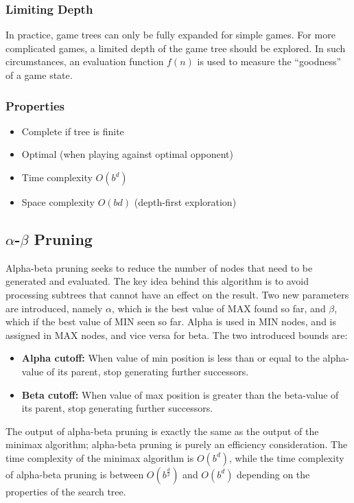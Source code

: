 \documentclass[12pt,titlepage]{article}
\begin{document}
      \subsubsection{Limiting Depth}
        In practice, game trees can only be fully expanded for simple games. For more complicated games, a limited depth of the game tree should be explored.
        In such circumstances, an evaluation function $f(n)$ is used to measure the ``goodness'' of a game state.

      \subsubsection{Properties}
        \begin{itemize}
          \item Complete if tree is finite
          \item Optimal (when playing against optimal opponent)
          \item Time complexity $O(b^d)$
          \item Space complexity $O(bd)$ (depth-first exploration)
        \end{itemize}

    \subsection{$\alpha$-$\beta$ Pruning}
      Alpha-beta pruning seeks to reduce the number of nodes that need to be generated and evaluated. The key idea behind this algorithm is to avoid
      processing subtrees that cannot have an effect on the result. Two new parameters are introduced, namely $\alpha$, which is the best value of MAX
      found so far, and $\beta$, which if the best value of MIN seen so far. Alpha is used in MIN nodes, and is assigned in MAX nodes, and vice versa for
      beta. The two introduced bounds are:
      \begin{itemize}
        \item \textbf{Alpha cutoff:} When value of min position is less than or equal to the alpha-value of its parent, stop generating further successors.
        \item \textbf{Beta cutoff:} When value of max position is greater than the beta-value of its parent, stop generating further successors.
      \end{itemize}

      The output of alpha-beta pruning is exactly the same as the output of the minimax algorithm; alpha-beta pruning is purely an efficiency consideration.
      The time complexity of the minimax algorithm is $O(b^d)$, while the time complexity of alpha-beta pruning is between $O(b^\frac{d}{2})$ and $O(b^d)$
      depending on the properties of the search tree.
\end{document}
